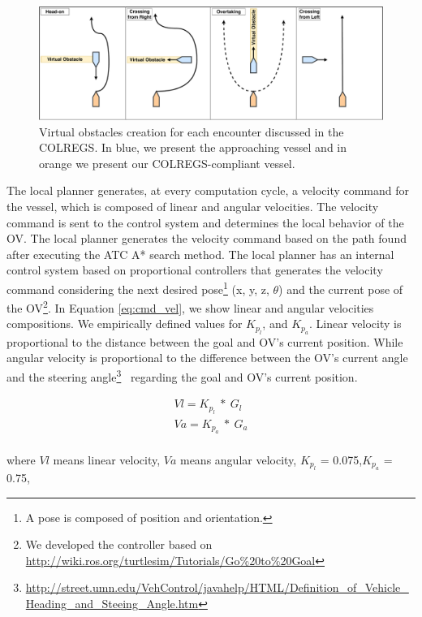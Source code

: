             \begin{figure}[H]
                \centering
                \includegraphics[scale=0.32]{figs/Chap4/atc.pdf}
                \caption{Virtual obstacles creation for each encounter discussed in the \ac{COLREGS}. In blue, we present the approaching vessel and in orange we present our \ac{COLREGS}-compliant vessel.
                }
                \label{fig:atc}
            \end{figure}
            The local planner generates, at every computation cycle, a velocity command for the vessel, which is composed of linear and angular velocities. The velocity command is sent to the control system and determines the local behavior of the \ac{OV}. The local planner generates the velocity command based on the path found after executing the \ac{ATC} A* search method. The local planner has an internal control system based on proportional controllers that generates the velocity command considering the next desired pose\footnote{A pose is composed of position and orientation.} (x, y, z, $\theta$) and the current pose of the \ac{OV}\footnote{We developed the controller based on \url{http://wiki.ros.org/turtlesim/Tutorials/Go\%20to\%20Goal}}. In Equation \ref{eq:cmd_vel}, we show linear and angular velocities compositions. We empirically defined values for $K_{p_{l}}$, and $K_{p_{a}}$. Linear velocity is proportional to the distance between the goal and \ac{OV}'s current position. While angular velocity is proportional to the difference between the \ac{OV}'s current angle and the  steering angle\footnote{\url{http://street.umn.edu/VehControl/javahelp/HTML/Definition\_of\_Vehicle\_Heading\_and\_Steeing\_Angle.htm}}~\cite{Pin1990Autonomous} regarding the goal and \ac{OV}'s current position.
            
            \begin{equation}
            \label{eq:cmd_vel}
            \begin{split}
                Vl = K_{p_{l}}\ *\ G_{l} \\
                Va = K_{p_{a}}\ *\ G_{a}
            \end{split}
            \end{equation}
            \\
            where $Vl$ means linear velocity, $Va$ means angular velocity, $K_{p_{l}}$ = 0.075,$K_{p_{a}}$ = 0.75, 
            
